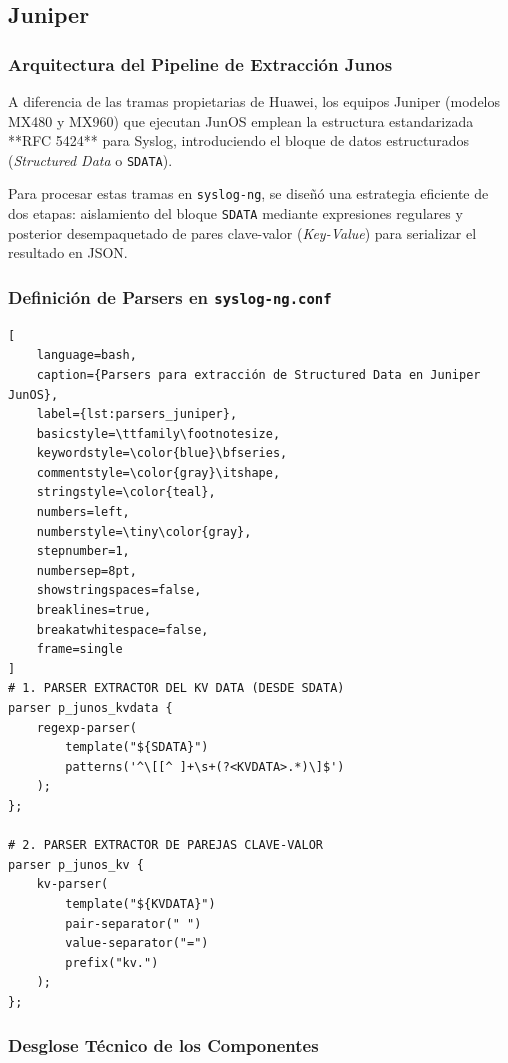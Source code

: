 \subsection{Juniper}
\subsubsection{Arquitectura del Pipeline de Extracción Junos}
A diferencia de las tramas propietarias de Huawei, los equipos Juniper (modelos MX480 y MX960) que ejecutan JunOS emplean la estructura estandarizada **RFC 5424** para Syslog, introduciendo el bloque de datos estructurados (\textit{Structured Data} o \texttt{SDATA}). 

Para procesar estas tramas en \texttt{syslog-ng}, se diseñó una estrategia eficiente de dos etapas: aislamiento del bloque \texttt{SDATA} mediante expresiones regulares y posterior desempaquetado de pares clave-valor (\textit{Key-Value}) para serializar el resultado en JSON.

\subsubsection{Definición de Parsers en \texttt{syslog-ng.conf}}

\begin{lstlisting}[
    language=bash,
    caption={Parsers para extracción de Structured Data en Juniper JunOS},
    label={lst:parsers_juniper},
    basicstyle=\ttfamily\footnotesize,
    keywordstyle=\color{blue}\bfseries,
    commentstyle=\color{gray}\itshape,
    stringstyle=\color{teal},
    numbers=left,
    numberstyle=\tiny\color{gray},
    stepnumber=1,
    numbersep=8pt,
    showstringspaces=false,
    breaklines=true,
    breakatwhitespace=false,
    frame=single
]
# 1. PARSER EXTRACTOR DEL KV DATA (DESDE SDATA)
parser p_junos_kvdata {
    regexp-parser(
        template("${SDATA}")
        patterns('^\[[^ ]+\s+(?<KVDATA>.*)\]$')
    );
};

# 2. PARSER EXTRACTOR DE PAREJAS CLAVE-VALOR
parser p_junos_kv {
    kv-parser(
        template("${KVDATA}")
        pair-separator(" ")
        value-separator("=")
        prefix("kv.")
    );
};
\end{lstlisting}

\subsubsection{Desglose Técnico de los Componentes}

